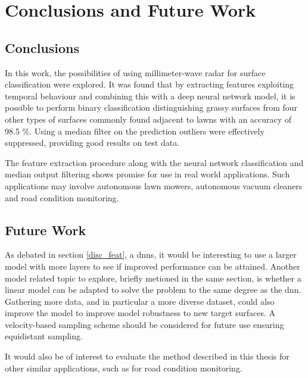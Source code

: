 \chapter{Conclusions and Future Work}

\section{Conclusions}

In this work, the possibilities of using millimeter-wave radar for surface classification were explored. It was found that by extracting features exploiting temporal behaviour and combining this with a deep neural network model, it is possible to perform binary classification distinguishing grassy surfaces from four other types of surfaces commonly found adjacent to lawns with an accuracy of 98.5 \%. Using a median filter on the prediction outliers were effectively suppressed, providing good results on test data. 

The feature extraction procedure along with the neural network classification and median output filtering shows promise for use in real world applications. Such applications may involve autonomous lawn mowers, autonomous vacuum cleaners and road condition monitoring. 



\section{Future Work}
As debated in section \ref{disc_feat}, a \gls{dnn}s, it would be interesting to use a larger model with more layers to see if improved performance can be attained. Another model related topic to explore, briefly metioned in the same section, is whether a linear model can be adapted to solve the problem to the same degree as the \gls{dnn}. Gathering more data, and in particular a more diverse dataset, could also improve the model to improve model robustness to new target surfaces. A velocity-based sampling scheme should be considered for future use ensuring equidistant sampling.

It would also be of interest to evaluate the method described in this thesis for other similar applications, such as for road condition monitoring. 


